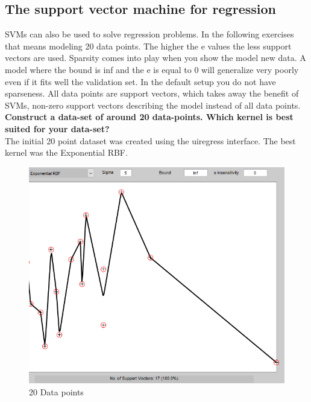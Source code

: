 \documentclass[11pt,oneside,a4paper]{article}
\begin{document}
\subsection{The support vector machine for regression}
SVMs can also be used to solve regression problems. In the following exercises that means modeling 20 data points. The higher the e values the less support vectors are used. Sparsity comes into play when you show the model new data. A model where the bound is inf and the e is equal to 0 will generalize very poorly even if it fits well the validation set. In the default setup you do not have sparseness. All data points are support vectors, which takes away the benefit of SVMs, non-zero support vectors describing the model instead of all data points. \\  
\textbf{Construct a data-set of around 20 data-points. Which kernel is best suited for your data-set?}\\
The initial 20 point dataset was created using the uiregress interface. The best kernel was the Exponential RBF. 
\begin{figure}[H]
	\centering
	\includegraphics[scale=0.4]{../Figures/urigress_best}
	\caption{20 Data points }
\end{figure}
\end{document}

